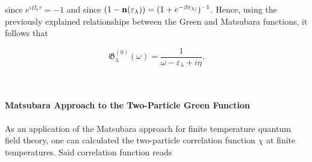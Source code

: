 since $e^{i\Omega_n \tau} = -1$ and since $(1-{\bf n}(\varepsilon_{\lambda})) = (1+e^{-\beta \varepsilon_{\lambda)}})^{-1}$. Hence, using the previously explained relationships between the Green and Matsubara functions, it follows that 

\begin{equation}
    \mathfrak{G}_{\lambda}^{(0)}(\omega) = \frac{1}{\omega - \varepsilon_{\lambda} + i \eta}. 
\end{equation}

\blanky \\

\paragraph{Matsubara Approach to the Two-Particle Green Function}

As an application of the Matsubara approach for finite temperature quantum field theory, one can calculated the two-particle correlation function $\chi$ at finite temperatures. Said correlation function reads 

